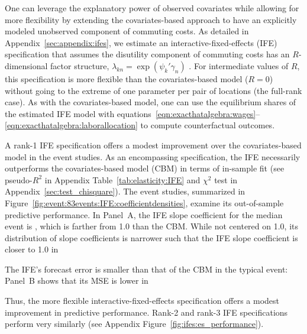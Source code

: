 \documentclass[11pt]{article}
\theoremstyle{definition}
\begin{document}
One can leverage the explanatory power of observed covariates while allowing for more flexibility 
by extending the covariates-based approach to have an explicitly modeled unobserved component of commuting costs.
As detailed in Appendix~\ref{sec:appendix:ifes},
we estimate an interactive-fixed-effects (IFE) specification that assumes
the disutility component of commuting costs has an $R$-dimensional factor structure,
$\lambda_{kn} = \exp(\psi_k'\gamma_n)$
\citep{bai2009panel,chen2021nonlinear}.
For intermediate values of $R$,
this specification is more flexible than the covariates-based model ($R=0$)
without going to the extreme of one parameter per pair of locations (the full-rank case).
As with the covariates-based model,
one can use the equilibrium shares of the estimated IFE model with equations~\eqref{eqn:exacthatalgebra:wages}--\eqref{eqn:exacthatalgebra:laborallocation} to compute counterfactual outcomes.

A rank-1 IFE specification
offers a modest improvement over the covariates-based model  
in the event studies.
As an encompassing specification, the IFE necessarily outperforms the covariates-based model (CBM) in terms of in-sample fit
(see pseudo-$R^2$ in Appendix Table~\ref{tab:elasticity:IFE} and $\chi^2$ test in Appendix~\ref{sec:test_chisquare}).
The event studies,
summarized in Figure~\ref{fig:event:83events:IFE:coefficientdensities}, 
examine its out-of-sample predictive performance.
In Panel~A,
the IFE slope coefficient for the median event is \unskip, which is farther from 1.0 than the CBM.
While not centered on 1.0, 
its distribution of slope coefficients is narrower
such that the IFE slope coefficient is closer to 1.0 in 

The IFE's forecast error is smaller than that of the CBM in the typical event:
Panel~B shows that its MSE is lower in 

Thus, the more flexible interactive-fixed-effects specification offers a modest improvement in predictive performance.
Rank-2 and rank-3 IFE specifications perform very similarly (see Appendix Figure~\ref{fig:ifes:es_performance}).
\end{document}
